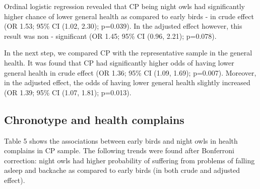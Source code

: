 \documentclass[ijerph,article,accept,moreauthors,pdftex]{mdpi}
\begin{document}
Ordinal logistic regression revealed that CP being night owls had
significantly higher chance of lower general health as compared to early
birds - in crude effect (OR 1.53; 95\% CI (1.02, 2.30); p=0.039). In the
adjusted effect however, this result was non - significant (OR 1.45;
95\% CI (0.96, 2.21); p=0.078).

In the next step, we compared CP with the representative sample in the
general health. It was found that CP had significantly higher odds of
having lower general health in crude effect (OR 1.36; 95\% CI (1.09,
1.69); p=0.007). Moreover, in the adjusted effect, the odds of having
lower general health slightly increased (OR 1.39; 95\% CI (1.07, 1.81);
p=0.013).

\hypertarget{chronotype-and-health-complains}{%
\subsection{Chronotype and health
complains}\label{chronotype-and-health-complains}}

Table 5 shows the associations between early birds and night owls in
health complains in CP sample. The following trends were found after
Bonferroni correction: night owls had higher probability of suffering
from problems of falling asleep and backache as compared to early birds
(in both crude and adjusted effect).

\begin{table}[!h]

\caption{\label{tab:Print regres tab 5}Depicts associations (in Odds rations) between eary bird and night owns and health complains (Sample 3)}
\centering
{}
\end{table}
\end{document}
